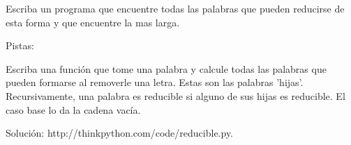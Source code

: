 \begin{enumerate}
 Escriba un programa que encuentre todas las palabras que pueden reducirse de esta forma y que encuentre la mas larga.

 Pistas:
 
 Escriba una función que tome una palabra y calcule todas las palabras que pueden formarse al removerle una letra. Estas
 son las palabras 'hijas'.
 Recursivamente, una palabra es reducible si alguno de sus hijas es reducible. El caso base lo da la cadena vacía.
  
 Solución: http://thinkpython.com/code/reducible.py.
\end{enumerate}
